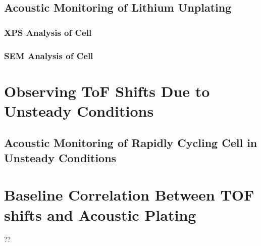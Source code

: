 \subsection{Acoustic Monitoring of Lithium Unplating}

\subsubsection{XPS Analysis of Cell}

\subsubsection{SEM Analysis of Cell}

\section{Observing ToF Shifts Due to Unsteady Conditions}

\subsection{Acoustic Monitoring of Rapidly Cycling Cell in Unsteady Conditions}

\section{Baseline Correlation Between TOF shifts and Acoustic Plating}
??